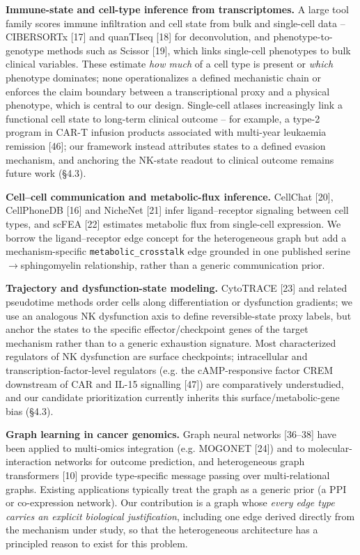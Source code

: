 \documentclass[modern,large,numbered,nocrop]{oup-authoring-template}
\begin{document}
\textbf{Immune-state and cell-type inference from transcriptomes.} A large tool family scores immune infiltration and cell state from bulk and single-cell data -- CIBERSORTx [17] and quanTIseq [18] for deconvolution, and phenotype-to-genotype methods such as Scissor [19], which links single-cell phenotypes to bulk clinical variables. These estimate \textit{how much} of a cell type is present or \textit{which} phenotype dominates; none operationalizes a defined mechanistic chain or enforces the claim boundary between a transcriptional proxy and a physical phenotype, which is central to our design. Single-cell atlases increasingly link a functional cell state to long-term clinical outcome -- for example, a type-2 program in CAR-T infusion products associated with multi-year leukaemia remission [46]; our framework instead attributes states to a defined evasion mechanism, and anchoring the NK-state readout to clinical outcome remains future work (\S{}4.3).

\textbf{Cell--cell communication and metabolic-flux inference.} CellChat [20], CellPhoneDB [16] and NicheNet [21] infer ligand--receptor signaling between cell types, and scFEA [22] estimates metabolic flux from single-cell expression. We borrow the ligand--receptor edge concept for the heterogeneous graph but add a mechanism-specific \texttt{metabolic\_crosstalk} edge grounded in one published serine$\to$sphingomyelin relationship, rather than a generic communication prior.

\textbf{Trajectory and dysfunction-state modeling.} CytoTRACE [23] and related pseudotime methods order cells along differentiation or dysfunction gradients; we use an analogous NK dysfunction axis to define reversible-state proxy labels, but anchor the states to the specific effector/checkpoint genes of the target mechanism rather than to a generic exhaustion signature. Most characterized regulators of NK dysfunction are surface checkpoints; intracellular and transcription-factor-level regulators (e.g. the cAMP-responsive factor CREM downstream of CAR and IL-15 signalling [47]) are comparatively understudied, and our candidate prioritization currently inherits this surface/metabolic-gene bias (\S{}4.3).

\textbf{Graph learning in cancer genomics.} Graph neural networks [36--38] have been applied to multi-omics integration (e.g. MOGONET [24]) and to molecular-interaction networks for outcome prediction, and heterogeneous graph transformers [10] provide type-specific message passing over multi-relational graphs. Existing applications typically treat the graph as a generic prior (a PPI or co-expression network). Our contribution is a graph whose \textit{every edge type carries an explicit biological justification}, including one edge derived directly from the mechanism under study, so that the heterogeneous architecture has a principled reason to exist for this problem.
\end{document}
